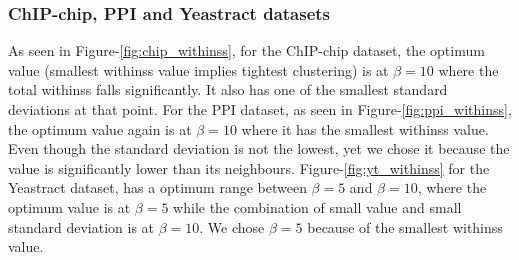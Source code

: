 \subsubsection{ChIP-chip, PPI and Yeastract datasets}
As seen in Figure-\ref{fig:chip_withinss}, for the ChIP-chip dataset, the optimum value (smallest withinss value implies tightest clustering) is at $\beta=10$ where the total 
withinss falls significantly. It also has one of the smallest standard deviations at that point. For the PPI dataset, as seen in Figure-\ref{fig:ppi_withinss}, the optimum 
value again is at $\beta=10$ where it has the smallest withinss value. Even though the standard deviation is not 
the lowest, yet we chose it because the value is significantly lower than its neighbours.
Figure-\ref{fig:yt_withinss} for the Yeastract dataset, has a optimum range between $\beta=5$ and $\beta=10$, where the optimum value is at $\beta=5$ while the combination of small value and small standard deviation 
is at $\beta=10$. We chose $\beta=5$ because of the smallest withinss value.    

